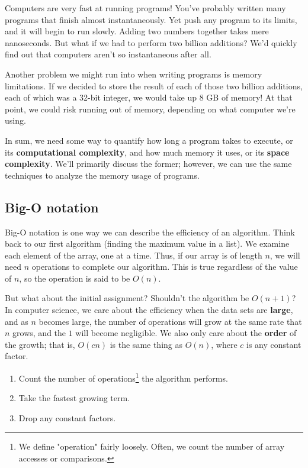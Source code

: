 Computers are very fast at running programs! You've probably written many programs that finish almost instantaneously. Yet push any program to its limits, and it will begin to run slowly. Adding two numbers together takes mere nanoseconds. But what if we had to perform two billion additions? We'd quickly find out that computers aren't so instantaneous after all.

Another problem we might run into when writing programs is memory limitations. If we decided to store the result of each of those two billion additions, each of which was a 32-bit integer, we would take up 8 GB of memory! At that point, we could risk running out of memory, depending on what computer we're using.

In sum, we need some way to quantify how long a program takes to execute, or its \textbf{computational complexity}, and how much memory it uses, or its \textbf{space complexity}. We'll primarily discuss the former; however, we can use the same techniques to analyze the memory usage of programs.


\subsection{Big-O notation}

Big-O notation is one way we can describe the efficiency of an algorithm.  Think back to our first algorithm (finding the maximum value in a list).  We examine each element of the array, one at a time.  Thus, if our array is of length $ n $, we will need $ n $ operations to complete our algorithm.  This is true regardless of the value of $ n $, so the operation is said to be $ O(n) $.

But what about the initial assignment? Shouldn't the algorithm be $ O(n + 1) $?  In computer science, we care about the efficiency when the data sets are \textbf{large}, and as $ n $ becomes large, the number of operations will grow at the same rate that $ n $ grows, and the $ 1 $ will become negligible.  We also only care about the \textbf{order} of the growth; that is, $ O(cn) $ is the same thing as $ O(n) $, where $ c $ is any constant factor.

\begin{enumerate}
    \item Count the number of operations\footnote{We define "operation" fairly loosely. Often, we count the number of array accesses or comparisons.} the algorithm performs.
    \item Take the fastest growing term.
    \item Drop any constant factors.
\end{enumerate}

